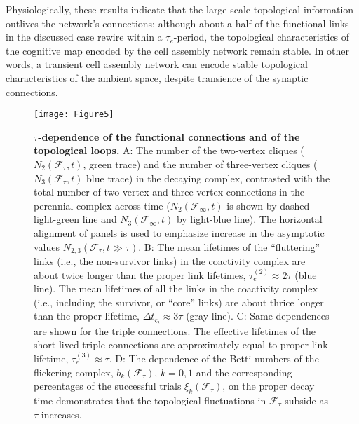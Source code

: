 \documentclass[12pt,tightenlines]{revtex4}
\begin{document}
Physiologically, these results indicate that the large-scale topological information outlives the network's connections: 
although about a half of the functional links in the discussed case rewire within a $\tau_{e}$-period, the topological 
characteristics of the cognitive map encoded by the cell assembly network remain stable. In other words, a transient 
cell assembly network can encode stable topological characteristics of the ambient space, despite transience of the 
synaptic connections.

\begin{figure}[!h]
\texttt{[image: Figure5]}
\caption{{\footnotesize\textbf{$\tau$-dependence of the functional connections and of the topological loops.} 
A: The number of the two-vertex cliques ($N_2(\mathcal{F}_{\tau},t)$, green trace) and the number of three-vertex 
cliques ($N_3(\mathcal{F}_{\tau},t)$ blue trace) in the decaying complex, contrasted with the total number of two-vertex 
and three-vertex connections in the perennial complex across time ($N_2(\mathcal{F}_{\infty},t)$ is shown by dashed 
light-green line and $N_3(\mathcal{F}_{\infty},t)$ by light-blue line). The horizontal alignment of panels is used to 
emphasize increase in the asymptotic values $N_{2,3}(\mathcal{F}_{\tau},t\gg\tau)$.
B: The mean lifetimes of the ``fluttering'' links (i.e., the non-survivor links) in the coactivity complex are about twice longer 
than the proper link lifetimes, $\tau^{(2)}_{e} \approx 2\tau$ (blue line). The mean lifetimes of all the links in the coactivity 
complex (i.e., including the survivor, or ``core'' links) are about thrice longer than the proper lifetime, $\Delta t_{\varsigma_2} 
\approx 3\tau$ (gray line). 
C: Same dependences are shown for the triple connections. The effective lifetimes of the short-lived triple connections are 
approximately equal to proper link lifetime, $\tau^{(3)}_{e} \approx \tau$. 
D: The dependence of the Betti numbers of the flickering complex, $b_k(\mathcal{F}_{\tau})$, $k = 0,1$ and the 
corresponding percentages of the successful trials $\xi_k(\mathcal{F}_{\tau})$, on the proper decay time demonstrates 
that the topological fluctuations in $\mathcal{F}_{\tau}$ subside as $\tau$ increases.}}
\label{Figure5}
\end{figure}
\end{document}
